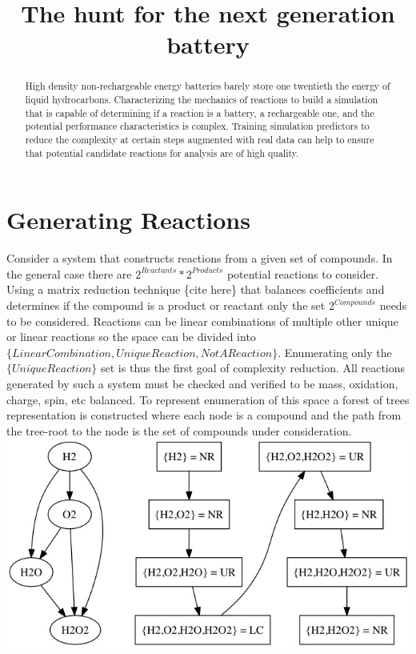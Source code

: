 \documentclass[12pt]{article}
\title{The hunt for the next generation battery}
\begin{document}
\maketitle
\begin{abstract}
High density non-rechargeable energy batteries barely store one twentieth the energy of liquid hydrocarbons. Characterizing the mechanics of reactions to build a simulation that is capable of determining if a reaction is a battery, a rechargeable one, and the potential performance characteristics is complex. Training simulation predictors to reduce the complexity at certain steps augmented with real data can help to ensure that potential candidate reactions for analysis are of high quality.
\end{abstract}
\section{Generating Reactions}
Consider a system that constructs reactions from a given set of compounds. In the general case there are $2^{Reactants} * 2^{Products}$ potential reactions to consider. Using a matrix reduction technique \{cite here\} that balances coefficients and determines if the compound is a product or reactant only the set $2^{Compounds}$ needs to be considered. Reactions can be linear combinations of multiple other unique or linear reactions so the space can be divided into $\{LinearCombination,UniqueReaction,NotAReaction\}$. Enumerating only the $\{UniqueReaction\}$ set is thus the first goal of complexity reduction. All reactions generated by such a system must be checked and verified to be mass, oxidation, charge, spin, etc balanced. To represent enumeration of this space a forest of trees representation is constructed where each node is a compound and the path from the tree-root to the node is the set of compounds under consideration.
\newpage
\includegraphics[scale=.50]{tree_set}
\end{document}
